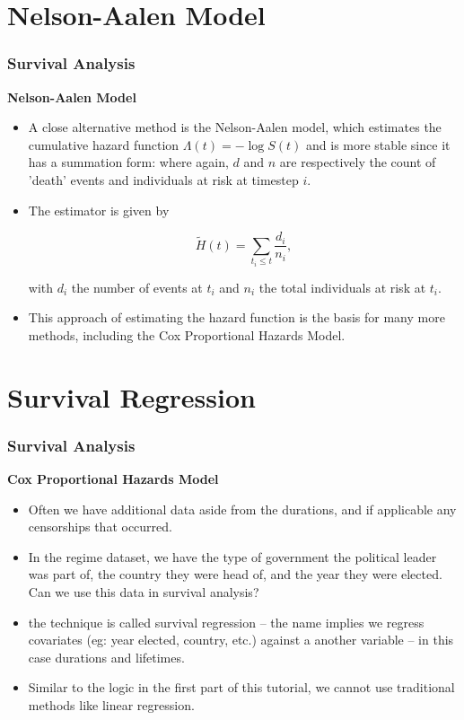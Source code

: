 \documentclass[]{beamer}
\begin{document}
	\section{Nelson-Aalen Model}
	\begin{frame}
		\frametitle{Survival Analysis}
		\textbf{Nelson-Aalen Model}
		\begin{itemize}
			\item A close alternative method is the Nelson-Aalen model, which estimates the cumulative hazard function $\Lambda(t)=-\log S(t)$ and is more stable since it has a summation form:
			where again, $d$ and $n$ are respectively the count of 'death' events and individuals at risk at timestep $i$.
			\item 
			The estimator is given by
			
			\[ {\displaystyle {\tilde {H}}(t)=\sum _{t_{i}\leq t}{\frac {d_{i}}{n_{i}}},}  \]
			
			with ${\displaystyle d_{i}} $ the number of events at ${\displaystyle t_{i}}$ and ${\displaystyle n_{i}}$ the total individuals at risk 
			at ${\displaystyle t_{i}}$.	
			\item This approach of estimating the hazard function is the basis for many more methods, including the Cox Proportional Hazards Model.
		\end{itemize}
		
	\end{frame}
	
	\section{Survival Regression}
	\begin{frame}
		\frametitle{Survival Analysis}
		\noindent \textbf{Cox Proportional Hazards Model}\\ \smallskip
		\begin{itemize}
			\item Often we have additional data aside from the durations, and if applicable any censorships that occurred. 
			\item In the regime dataset, we have the type of government the political leader was part of, the country they were head of, and the year they were elected. Can we use this data in survival analysis?
			
			\item the technique is called survival regression – the name implies we regress covariates (eg: year elected, country, etc.) against a another variable – in this case durations and lifetimes. 
			\item Similar to the logic in the first part of this tutorial, we cannot use traditional methods like linear regression.
		\end{itemize}
		
	\end{frame}
	
\end{document}
